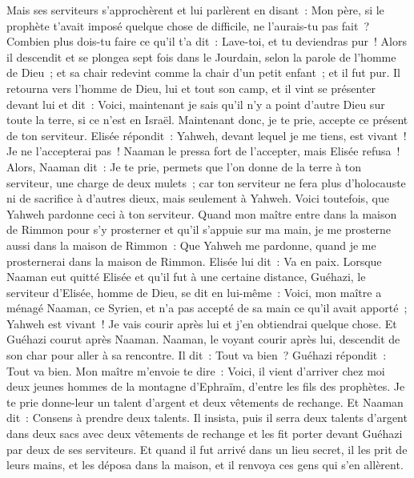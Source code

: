 \begin{multicols}{2}
Mais ses serviteurs s'approchèrent et lui parlèrent en disant~: Mon père, si le prophète t'avait imposé quelque chose de difficile, ne l'aurais-tu pas fait~? Combien plus dois-tu faire ce qu'il t'a dit~: Lave-toi, et tu deviendras pur~!
Alors il descendit et se plongea sept fois dans le Jourdain, selon la parole de l'homme de Dieu~; et sa chair redevint comme la chair d'un petit enfant~; et il fut pur.
Il retourna vers l'homme de Dieu, lui et tout son camp, et il vint se présenter devant lui et dit~: Voici, maintenant je sais qu'il n'y a point d'autre Dieu sur toute la terre, si ce n'est en Israël. Maintenant donc, je te prie, accepte ce présent de ton serviteur.
Elisée répondit~: Yahweh, devant lequel je me tiens, est vivant~! Je ne l'accepterai pas~! Naaman le pressa fort de l'accepter, mais Elisée refusa~!
Alors, Naaman dit~: Je te prie, permets que l'on donne de la terre à ton serviteur, une charge de deux mulets~; car ton serviteur ne fera plus d'holocauste ni de sacrifice à d'autres dieux, mais seulement à Yahweh.
Voici toutefois, que Yahweh pardonne ceci à ton serviteur. Quand mon maître entre dans la maison de Rimmon pour s'y prosterner et qu'il s'appuie sur ma main, je me prosterne aussi dans la maison de Rimmon~: Que Yahweh me pardonne, quand je me prosternerai dans la maison de Rimmon.
Elisée lui dit~: Va en paix. Lorsque Naaman eut quitté Elisée et qu'il fut à une certaine distance,
Guéhazi, le serviteur d'Elisée, homme de Dieu, se dit en lui-même~: Voici, mon maître a ménagé Naaman, ce Syrien, et n'a pas accepté de sa main ce qu'il avait apporté~; Yahweh est vivant~! Je vais courir après lui et j'en obtiendrai quelque chose.
Et Guéhazi courut après Naaman. Naaman, le voyant courir après lui, descendit de son char pour aller à sa rencontre. Il dit~: Tout va bien~?
Guéhazi répondit~: Tout va bien. Mon maître m'envoie te dire~: Voici, il vient d'arriver chez moi deux jeunes hommes de la montagne d'Ephraïm, d'entre les fils des prophètes. Je te prie donne-leur un talent d'argent et deux vêtements de rechange.
Et Naaman dit~: Consens à prendre deux talents. Il insista, puis il serra deux talents d'argent dans deux sacs avec deux vêtements de rechange et les fit porter devant Guéhazi par deux de ses serviteurs.
Et quand il fut arrivé dans un lieu secret, il les prit de leurs mains, et les déposa dans la maison, et il renvoya ces gens qui s'en allèrent.

\end{multicols}
